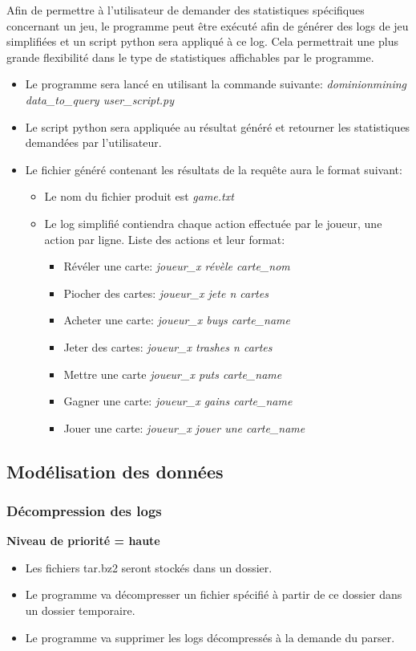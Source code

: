 Afin de permettre à l'utilisateur de demander des statistiques spécifiques concernant un jeu, le programme peut être exécuté afin de générer des logs de jeu simplifiées et un script python sera appliqué à ce log. Cela permettrait une plus grande flexibilité dans le type de statistiques affichables par le programme.
\begin{itemize}
\item Le programme sera lancé en utilisant la commande suivante: \textit{dominionmining data\_to\_query user\_script.py}
 \item Le script python sera appliquée au résultat généré et retourner les statistiques demandées par l'utilisateur.
\item Le fichier généré contenant les résultats de la requête aura le format suivant:
\begin{itemize}
\item Le nom du fichier produit est \textit{game.txt}
\item Le log simplifié contiendra chaque action effectuée par le joueur, une action par ligne. Liste des actions et leur format:
\begin{itemize}
\item Révéler une carte: \textit{joueur\_x révèle carte\_nom}
\item Piocher des cartes: \textit{joueur\_x jete n cartes}
\item Acheter une carte: \textit{joueur\_x buys carte\_name}
\item Jeter des cartes: \textit{joueur\_x trashes n cartes}
\item Mettre une carte \textit{joueur\_x puts carte\_name}
\item Gagner une carte: \textit{joueur\_x gains carte\_name}
\item Jouer une carte: \textit{joueur\_x jouer une carte\_name}

\end{itemize}
\end{itemize}
\end{itemize}
\fi
\subsection{Modélisation des données}

\subsubsection{Décompression des logs}
\textbf{Niveau de priorité = haute}\\
\begin{itemize}
  \item Les fichiers tar.bz2 seront stockés dans un dossier.
  \item Le programme va  décompresser un fichier spécifié à partir de ce dossier dans un dossier temporaire.
  \item Le programme va  supprimer les logs décompressés  à la demande du parser.
\end{itemize}

